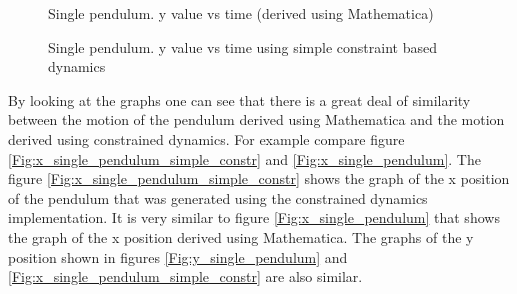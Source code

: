 \begin{figure}    
	\begin{center}
	\end{center}
    \caption{Single pendulum. y value vs time (derived using Mathematica)}
	\label{Fig:y_single_pendulum}
	\begin{center}
	\end{center}
    \caption{Single pendulum. y value vs time using simple constraint based dynamics}
	\label{Fig:y_single_pendulum_simple_constr}
\end{figure} 

By looking at the graphs one can see that there is a great deal of similarity
between the motion of the pendulum derived using Mathematica and the motion
derived using constrained dynamics. For example compare figure
\ref{Fig:x_single_pendulum_simple_constr} and \ref{Fig:x_single_pendulum}. The
figure \ref{Fig:x_single_pendulum_simple_constr} shows the graph of the x position of the
pendulum that was generated using the constrained dynamics implementation. It is
very similar to figure \ref{Fig:x_single_pendulum} that shows the graph of the x
position derived using Mathematica. The graphs of the y position shown
in figures \ref{Fig:y_single_pendulum} and
\ref{Fig:x_single_pendulum_simple_constr} are also similar.

